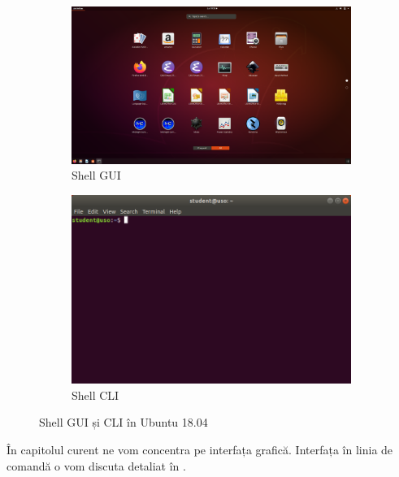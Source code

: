 \begin{figure}[htbp]
  \centering
  \begin{subfigure}[b]{0.6\textwidth}
    \includegraphics[width=\textwidth]{chapters/01-ui/img/gui-shell-screenshot.png}
    \caption{Shell GUI}
    \label{fig:ui:shell-gui-cli:gui}
  \end{subfigure}

  \begin{subfigure}[b]{0.6\textwidth}
    \includegraphics[width=\textwidth]{chapters/01-ui/img/cli-shell-screenshot.png}
    \caption{Shell CLI}
    \label{fig:ui:shell-gui-cli:cli}
  \end{subfigure}

  \caption{Shell GUI și CLI în Ubuntu 18.04}
  \label{fig:ui:shell-gui-cli}
\end{figure}

În capitolul curent ne vom concentra pe interfața grafică. Interfața în linia de comandă o vom discuta detaliat în .

